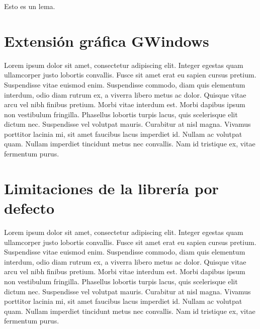\begin{lemma}[Gauss]\label{lem:1}
    Esto es un lema.
\end{lemma}

\section{Extensión gráfica GWindows}

Lorem ipsum dolor sit amet, consectetur adipiscing elit. Integer egestas quam ullamcorper justo lobortis convallis. Fusce sit amet erat eu sapien cursus pretium. Suspendisse vitae euismod enim. Suspendisse commodo, diam quis elementum interdum, odio diam rutrum ex, a viverra libero metus ac dolor. Quisque vitae arcu vel nibh finibus pretium. Morbi vitae interdum est. Morbi dapibus ipsum non vestibulum fringilla. Phasellus lobortis turpis lacus, quis scelerisque elit dictum nec. Suspendisse vel volutpat mauris. Curabitur at nisl magna. Vivamus porttitor lacinia mi, sit amet faucibus lacus imperdiet id. Nullam ac volutpat quam. Nullam imperdiet tincidunt metus nec convallis. Nam id tristique ex, vitae fermentum purus.

\section{Limitaciones de la librería por defecto}

Lorem ipsum dolor sit amet, consectetur adipiscing elit. Integer egestas quam ullamcorper justo lobortis convallis. Fusce sit amet erat eu sapien cursus pretium. Suspendisse vitae euismod enim. Suspendisse commodo, diam quis elementum interdum, odio diam rutrum ex, a viverra libero metus ac dolor. Quisque vitae arcu vel nibh finibus pretium. Morbi vitae interdum est. Morbi dapibus ipsum non vestibulum fringilla. Phasellus lobortis turpis lacus, quis scelerisque elit dictum nec. Suspendisse vel volutpat mauris. Curabitur at nisl magna. Vivamus porttitor lacinia mi, sit amet faucibus lacus imperdiet id. Nullam ac volutpat quam. Nullam imperdiet tincidunt metus nec convallis. Nam id tristique ex, vitae fermentum purus.

